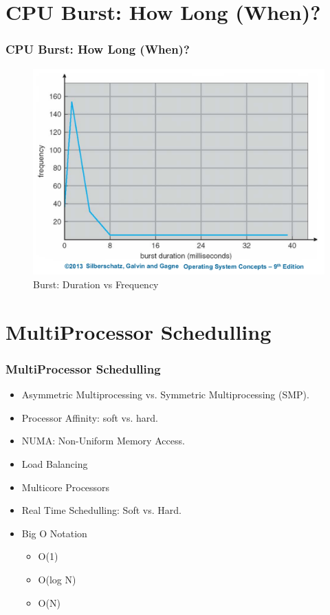 \documentclass[xcolor=table, notheorems, hyperref={pdfpagelabels=false}]{beamer}
\begin{document}
\section{CPU Burst: How Long (When)?}
\begin{frame}
\frametitle{CPU Burst: How Long (When)?}
\begin{figure}
\includegraphics[width=0.80\linewidth]{os08-osc9}
\caption{Burst: Duration vs Frequency}
\end{figure}
\end{frame}

\section{MultiProcessor Schedulling}
\begin{frame}
\frametitle{MultiProcessor Schedulling}
\begin{itemize}
\item Asymmetric Multiprocessing vs. Symmetric Multiprocessing (SMP).
\item Processor Affinity: soft vs. hard.
\item NUMA: Non-Uniform Memory Access.
\item Load Balancing
\item Multicore Processors
\item Real Time Schedulling: Soft vs. Hard.
\item Big O Notation
\begin{itemize}
\item O(1)
\item O(log N)
\item O(N)
\end{itemize}
\end{itemize}
\end{frame}
\end{document}
